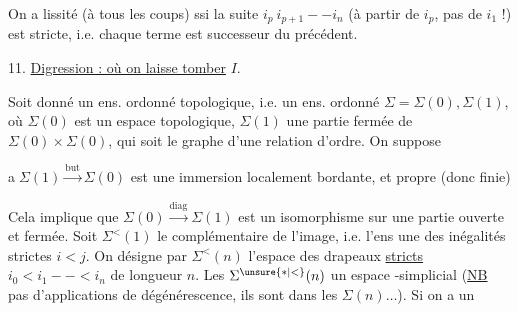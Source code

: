 On a lissité (à tous les coups) ssi  la suite $i_p\ i_{p+1}--i_n$ (à partir de $i_p$, pas de $i_1$ !) est stricte, i.e. chaque terme  est successeur  du précédent.

11. \uline{Digression : où on laisse tomber} $I$.

Soit donné un ens. ordonné topologique, i.e. un  ens. ordonné $\Sigma=\Sigma(0),\Sigma(1)$, où $\Sigma(0)$ est un espace topologique, $\Sigma(1)$ une partie fermée de $\Sigma(0)\times\Sigma(0)$, qui soit le graphe d'une relation d'ordre. On suppose

\textcircled{a}\quad $\Sigma(1)\xrightarrow{\mathrm{but}}\Sigma(0)$ est une immersion localement bordante, et propre (donc finie)

 Cela implique que $\Sigma(0)\xrightarrow{\mathrm{diag}}\Sigma(1)$ est un isomorphisme sur une partie ouverte et fermée. Soit $\Sigma^{<}(1)$ le complémentaire de l'image, i.e. l'ens  une des inégalités strictes $i<j$. On désigne par $\Sigma^{<}(n)$ l'espace des drapeaux \uline{stricts} $i_0<i_1--<i_n$ de longueur $n$. Les $\Sigma^{\unsure{*|<}}(n)$   un espace -simplicial (\uline{NB} pas d'applications de dégénérescence,  ils sont dans les $\Sigma(n)\ldots$).  Si on a un
